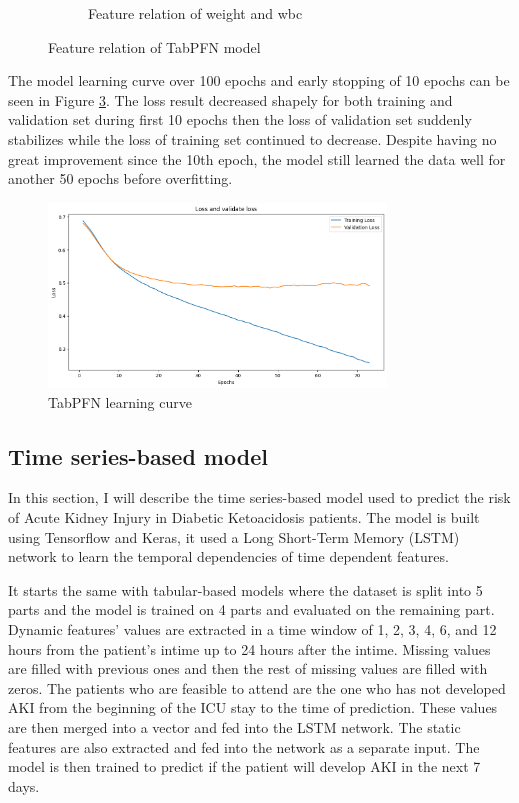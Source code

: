 \documentclass[../main.tex]{subfiles}
\begin{document}
\begin{figure}[H]
\begin{subfigure}{0.45\textwidth}
        \caption{Feature relation of weight and wbc}
        \label{fig:tabpfn-weight-wbc}
    \end{subfigure}

    \caption{Feature relation of TabPFN model}
    \label{fig:tabpfn-feature-relation}
\end{figure}


The model learning curve over 100 epochs and early stopping of 10 epochs can be seen in Figure \ref{fig:tabpfn-learning-curve}.
The loss result decreased shapely for both training and validation set during first 10 epochs then the loss of validation set suddenly  stabilizes while the loss of training set continued to decrease.
Despite having no great improvement since the 10th epoch, the model still learned the data well for another 50 epochs before overfitting.
\begin{figure}[H]
    \centering
    \includegraphics[width=0.8\textwidth]{./Figure/tabpfn-loss-graph.png}
    \caption{TabPFN learning curve}
    \label{fig:tabpfn-learning-curve}
\end{figure}

\subsection{Time series-based model}

In this section, I will describe the time series-based model used to predict the risk of Acute Kidney Injury in Diabetic Ketoacidosis patients.
The model is built using Tensorflow and Keras, it used a Long Short-Term Memory (LSTM) network to learn the temporal dependencies of time dependent features.

It starts the same with tabular-based models where the dataset is split into 5 parts and the model is trained on 4 parts and evaluated on the remaining part.
Dynamic features' values are extracted in a time window of 1, 2, 3, 4, 6, and 12 hours from the patient's intime up to 24 hours after the intime.
Missing values are filled with previous ones and then the rest of missing values are filled with zeros.
The patients who are feasible to attend are the one who has not developed AKI from the beginning of the ICU stay to the time of prediction.
These values are then merged into a vector and fed into the LSTM network.
The static features are also extracted and fed into the network as a separate input.
The model is then trained to predict if the patient will develop AKI in the next 7 days.
\end{document}
